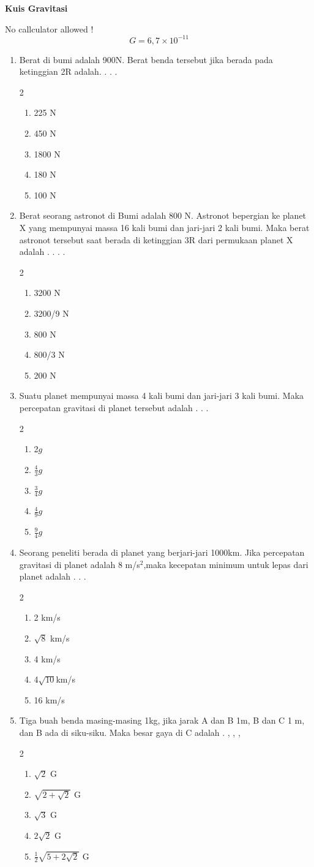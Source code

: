 \documentclass[14pt,a4paper]{extarticle}
\newcommand{\pilgani}[1]{                            \vspace{-0.3cm}\begin{multicols}{2}
 \begin{enumerate}[label=\Alph*., itemsep=0pt,topsep=0pt,leftmargin=*,align=Center]#1                     \end{enumerate}
 \phantom{ini cuma sapi, wedus, dan ayam}
 \end{multicols}}
\begin{document}
 \textbf{Kuis Gravitasi} \phantom{ini nama siswa yang aaamengerjakan soal kuis ini }  

No callculator allowed !  
$$ G = 6,7 \times 10^{-11}$$

\begin{enumerate}

\item Berat di bumi adalah 900N. Berat benda tersebut jika berada pada ketinggian 2R adalah. . . . \pilgani{
    \item 225 N
    \item 450 N
    \item 1800 N
    \item 180 N
    \item 100 N
}

\item Berat seorang astronot di Bumi adalah 800 N. Astronot bepergian ke planet X yang mempunyai massa 16 kali bumi dan jari-jari 2 kali bumi. Maka berat astronot tersebut saat berada di ketinggian 3R dari permukaan planet X adalah . . . .
\pilgani {
    \item 3200 N
    \item 3200/9 N
    \item 800 N
    \item 800/3 N
    \item 200 N }

\item Suatu planet mempunyai massa 4 kali bumi dan jari-jari 3 kali bumi. Maka percepatan gravitasi di planet tersebut adalah . . . 
\pilgani{
    \item 2$g$
    \item $\frac{4}{3} g$
    \item $\frac{3}{4} g$
    \item $\frac{4}{9} g$
    \item $\frac{9}{4} g$
    }

\item Seorang peneliti berada di planet yang berjari-jari 1000km. Jika percepatan gravitasi di planet adalah 8 m/s$^2$,maka kecepatan minimum untuk lepas dari planet adalah . . . 
\pilgani{
    \item 2 km/s
    \item $\sqrt{8}$ km/s
    \item 4 km/s
    \item 4$\sqrt{10}$km/s
    \item 16 km/s
}

\item Tiga buah benda masing-masing 1kg, jika jarak A dan B 1m, B dan C 1 m, dan B ada di siku-siku. Maka besar gaya di C  adalah . , , , 
\pilgani{
    \item $\sqrt{2}$ G
    \item $\sqrt{2+\sqrt{2}}$ G
    \item $\sqrt{3}$ G
    \item $ 2 \sqrt{2}$ G
    \item $\frac{1}{2} \sqrt{5+2\sqrt{2}}$ G
}




\end{enumerate}
\end{document}
